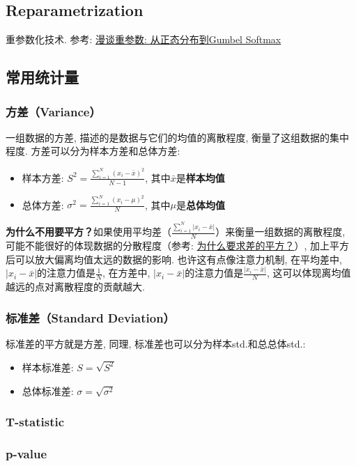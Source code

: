 \subsection{Reparametrization}重参数化技术. 参考: \href{https://spaces.ac.cn/archives/6705}{漫谈重参数: 从正态分布到Gumbel Softmax}

\subsection{常用统计量}
\subsubsection{方差（Variance）} 一组数据的方差, 描述的是数据与它们的均值的离散程度, 衡量了这组数据的集中程度. 方差可以分为样本方差和总体方差: 
\begin{itemize}
	\item 样本方差: $S^2 = \frac{\sum_{i=1}^N(x_i - \bar{x})^2}{N-1}$, 其中$\bar{x}$是\textbf{样本均值}
	\item 总体方差: $\sigma^2 = \frac{\sum_{i=1}^N(x_i - \mu)^2}{N}$, 其中$\mu$是\textbf{总体均值}
\end{itemize}
\textbf{为什么不用要平方？}如果使用平均差（$\frac{\sum_{i=1}^N |x_i - \bar{x}|}{N}$）来衡量一组数据的离散程度, 可能不能很好的体现数据的分散程度（参考: \href{https://www.shuxuele.com/data/standard-deviation.html#WhySquare}{为什么要求差的平方？}）, 加上平方后可以放大偏离均值太远的数据的影响. 也许这有点像注意力机制, 在平均差中, $|x_i - \bar{x}|$的注意力值是$\frac{1}{N}$, 在方差中, $|x_i - \bar{x}|$的注意力值是$\frac{|x_i - \bar{x}|}{N}$, 这可以体现离均值越远的点对离散程度的贡献越大. 

\subsubsection{标准差（Standard Deviation）} 标准差的平方就是方差, 同理, 标准差也可以分为样本std.和总总体std.: 
\begin{itemize}
	\item 样本标准差: $S = \sqrt{S^2}$
	\item 总体标准差: $\sigma = \sqrt{\sigma^2}$
\end{itemize}

\subsubsection{T-statistic }


\subsubsection{p-value }

